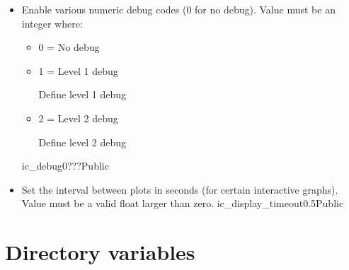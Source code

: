 \begin{itemize}
\item {}
{Enable various numeric debug codes (0 for no debug). Value must be an integer where:
\begin{itemize}
\item 0 = No debug
\item 1 = Level 1 debug \begin{todo}Define level 1 debug\end{todo}
\item 2 = Level 2 debug \begin{todo}Define level 2 debug\end{todo}
\end{itemize}
}
{ic\_debug}{0}{\callocRAW}{\constantsfile}{???}{Public}


\item {}
{Set the interval between plots in seconds (for certain interactive graphs). Value must be a valid float larger than zero.}
{ic\_display\_timeout}{0.5}{\callocRAW}{\constantsfile}{}{Public}

\end{itemize}


\section{Directory variables}
\label{ch:variables:directory}

